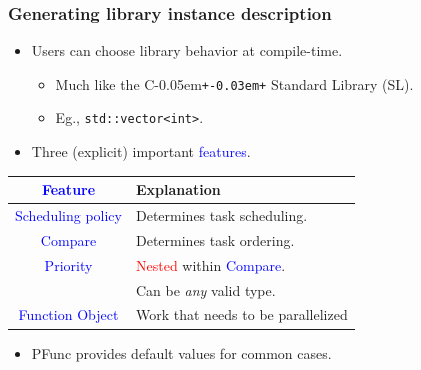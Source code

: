 \documentclass{beamer}
\newcommand{\code}[1]{\lstinline[basicstyle=\sffamily]{#1}}
\newcommand{\Cpp}{C\kern-0.05em\texttt{+\kern-0.03em+}}
\newcommand{\tablefont}{\fontsize{8}{13}\selectfont}
\begin{document}
\begin{frame}
\frametitle{Generating library instance description}
\begin{itemize}
\item Users can choose library behavior at compile-time.
  \begin{itemize}
  \item Much like the \Cpp{} Standard Library (SL).
  \item Eg., \code{std::vector<int>}.
  \end{itemize}
\item Three (explicit) important \textcolor{blue}{features}.
\end{itemize}
\begin{center}
\tablefont
\begin{tabular}{|c|l|}
\hline
\textcolor{blue}{Feature} & Explanation \\
\hline
\textcolor{blue}{Scheduling policy} & Determines task scheduling. \\
\hline
\textcolor{blue}{Compare} & Determines task ordering. \\
\hline
\textcolor{blue}{Priority} & \textcolor{red}{Nested} within \textcolor{blue}{Compare}. \\
                           & Can be \textit{any} valid type. \\
\hline
\textcolor{blue}{Function Object} & Work that needs to be parallelized \\
\hline
\end{tabular}
\normalsize
\end{center}
\begin{itemize}
\item PFunc provides default values for common cases.
\end{itemize}
\end{frame}
\end{document}
